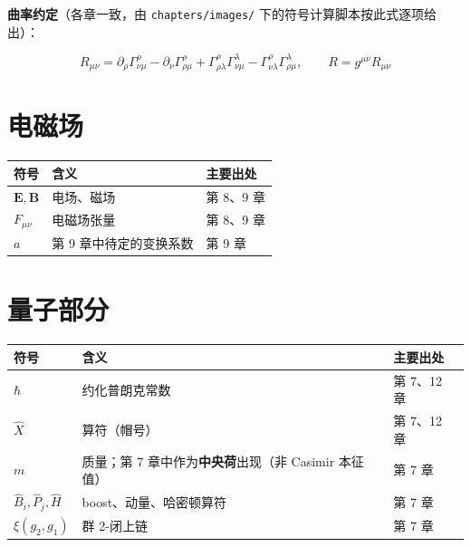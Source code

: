 \documentclass[
  chinese,
  a4paper,
  UTF8,
  12pt,
  oneside,
  openany]{ctexbook}
\newcounter{none} %
\theoremstyle{plain}
\theoremstyle{plain}
\theoremstyle{plain}
\theoremstyle{definition}
\theoremstyle{plain}
\theoremstyle{plain}
\theoremstyle{remark}
\begin{document}
\textbf{曲率约定}（各章一致，由 \texttt{chapters/images/}
下的符号计算脚本按此式逐项给出）：

\[
R_{\mu\nu}
=\partial_{\rho}\Gamma^{\rho}_{\nu\mu}
-\partial_{\nu}\Gamma^{\rho}_{\rho\mu}
+\Gamma^{\rho}_{\rho\lambda}\Gamma^{\lambda}_{\nu\mu}
-\Gamma^{\rho}_{\nu\lambda}\Gamma^{\lambda}_{\rho\mu},
\qquad R=g^{\mu\nu}R_{\mu\nu}
\]

\section*{电磁场}\label{sec-notation-em}


{\def\LTcaptype{none} %
\begin{longtable}[]{@{}lll@{}}
\toprule\noalign{}
符号 & 含义 & 主要出处 \\
\midrule\noalign{}
\endhead
\bottomrule\noalign{}
\endlastfoot
\(\mathbf{E},\mathbf{B}\) & 电场、磁场 & 第 8、9 章 \\
\(F_{\mu\nu}\) & 电磁场张量 & 第 8、9 章 \\
\(a\) & 第 9 章中待定的变换系数 & 第 9 章 \\
\end{longtable}
}

\section*{量子部分}\label{sec-notation-quantum}


{\def\LTcaptype{none} %
\begin{longtable}[]{@{}
  >{\raggedright\arraybackslash}p{}
  >{\raggedright\arraybackslash}p{}
  >{\raggedright\arraybackslash}p{}@{}}
\toprule\noalign{}
\begin{minipage}[b]{\linewidth}\raggedright
符号
\end{minipage} & \begin{minipage}[b]{\linewidth}\raggedright
含义
\end{minipage} & \begin{minipage}[b]{\linewidth}\raggedright
主要出处
\end{minipage} \\
\midrule\noalign{}
\endhead
\bottomrule\noalign{}
\endlastfoot
\(\hbar\) & 约化普朗克常数 & 第 7、12 章 \\
\(\hat{X}\) & 算符（帽号） & 第 7、12 章 \\
\(m\) & 质量；第 7 章中作为\textbf{中央荷}出现（非 Casimir 本征值） & 第
7 章 \\
\(\hat{B}_{i},\hat{P}_{j},\hat{H}\) & boost、动量、哈密顿算符 & 第 7
章 \\
\(\xi(g_{2},g_{1})\) & 群 2-闭上链 & 第 7 章 \\
\end{longtable}
}
\end{document}
